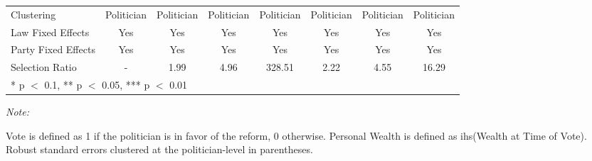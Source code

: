 \begin{table}[!h]
{\begin{threeparttable}
\begin{tabular}[t]{lccccccc}
Clustering & Politician & Politician & Politician & Politician & Politician & Politician & Politician\\
Law Fixed Effects & Yes & Yes & Yes & Yes & Yes & Yes & Yes\\
Party Fixed Effects & Yes & Yes & Yes & Yes & Yes & Yes & Yes\\
Selection Ratio & - & 1.99 & 4.96 & 328.51 & 2.22 & 4.55 & 16.29\\
\bottomrule
\multicolumn{8}{l}{\rule{0pt}{1em}* p $<$ 0.1, ** p $<$ 0.05, *** p $<$ 0.01}\\
\end{tabular}
\begin{tablenotes}[para]
\item \textit{Note:} 
\item Vote is defined as 1 if the politician is in favor of the reform, 0 otherwise. Personal Wealth is defined as ihs(Wealth at Time of Vote). Robust standard errors clustered at the politician-level in parentheses.
\end{tablenotes}
\end{threeparttable}}
\end{table}
